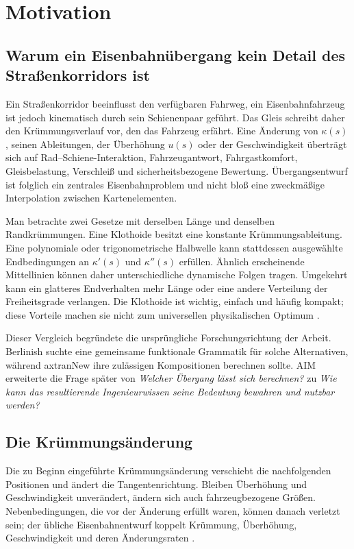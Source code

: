 
\chapter{Motivation}

\section{Warum ein Eisenbahnübergang kein Detail des Straßenkorridors ist}

Ein Straßenkorridor beeinflusst den verfügbaren Fahrweg, ein
Eisenbahnfahrzeug ist jedoch kinematisch durch sein Schienenpaar geführt. Das
Gleis schreibt daher den Krümmungsverlauf vor, den das Fahrzeug erfährt. Eine
Änderung von \(\kappa(s)\), seinen Ableitungen, der Überhöhung \(u(s)\) oder
der Geschwindigkeit überträgt sich auf Rad--Schiene-Interaktion,
Fahrzeugantwort, Fahrgastkomfort, Gleisbelastung, Verschleiß und
sicherheitsbezogene Bewertung. Übergangsentwurf ist folglich ein zentrales
Eisenbahnproblem und nicht bloß eine zweckmäßige Interpolation zwischen
Kartenelementen.

Man betrachte zwei Gesetze mit derselben Länge und denselben Randkrümmungen.
Eine Klothoide besitzt eine konstante Krümmungsableitung. Eine polynomiale oder
trigonometrische Halbwelle kann stattdessen ausgewählte Endbedingungen an
\(\kappa'(s)\) und \(\kappa''(s)\) erfüllen. Ähnlich erscheinende
Mittellinien können daher unterschiedliche dynamische Folgen tragen.
Umgekehrt kann ein glatteres Endverhalten mehr Länge oder eine andere
Verteilung der Freiheitsgrade verlangen. Die Klothoide ist wichtig, einfach
und häufig kompakt; diese Vorteile machen sie nicht zum universellen
physikalischen Optimum
\cite{BrustadDalmo2020Review,Koc2017SmoothedEnds}.

Dieser Vergleich begründete die ursprüngliche Forschungsrichtung der Arbeit.
Berlinish suchte eine gemeinsame funktionale Grammatik für solche
Alternativen, während axtranNew ihre zulässigen Kompositionen berechnen sollte.
AIM erweiterte die Frage später von \emph{Welcher Übergang lässt sich
berechnen?} zu \emph{Wie kann das resultierende Ingenieurwissen seine
Bedeutung bewahren und nutzbar werden?}

\section{Die Krümmungsänderung}

Die zu Beginn eingeführte Krümmungsänderung verschiebt die nachfolgenden
Positionen und ändert die Tangentenrichtung. Bleiben Überhöhung und
Geschwindigkeit unverändert, ändern sich auch fahrzeugbezogene Größen.
Nebenbedingungen, die vor der Änderung erfüllt waren, können danach verletzt
sein; der übliche Eisenbahnentwurf koppelt Krümmung, Überhöhung,
Geschwindigkeit und deren Änderungsraten
\cite{EN13803_2017,Klein1998Trassierung}.

